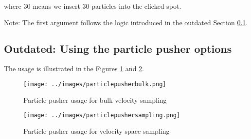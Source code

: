 \documentclass[a4paper,10pt]{article}
\begin{document}
where 30 means we insert 30 particles into the clicked spot.

Note: The first argument follows the logic introduced in the outdated Section \ref{ssec:outdated}.

\subsection{Outdated: Using the particle pusher options} \label{ssec:outdated}

The usage is illustrated in the Figures \ref{fig:particle1} and \ref{fig:particle2}.

\begin{figure}[H]
 \centering
 \texttt{[image: ../images/particlepusherbulk.png]}
 \caption{Particle pusher usage for bulk velocity sampling}
 \label{fig:particle1}
\end{figure}

\begin{figure}[H]
 \centering
 \texttt{[image: ../images/particlepushersampling.png]}
 \caption{Particle pusher usage for velocity space sampling}
 \label{fig:particle2}
\end{figure}
\end{document}
